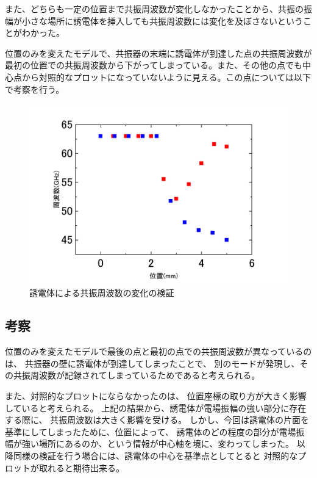 また、どちらも一定の位置まで共振周波数が変化しなかったことから、共振の振幅が小さな場所に誘電体を挿入しても共振周波数には変化を及ぼさないということがわかった。

位置のみを変えたモデルで、共振器の末端に誘電体が到達した点の共振周波数が最初の位置での共振周波数から下がってしまっている。また、その他の点でも中心点から対照的なプロットになっていないように見える。この点については以下で考察を行う。

\vspace{10 mm}

\begin{figure}[h]
  \begin{center}
    \includegraphics[width=12cm]{./image/plot1.jpg}
    \caption{誘電体による共振周波数の変化の検証}
    \label{fig:Cavity}
  \end{center}
\end{figure}


\subsection*{考察}
位置のみを変えたモデルで最後の点と最初の点での共振周波数が異なっているのは、
共振器の壁に誘電体が到達してしまったことで、
別のモードが発現し、その共振周波数が記録されてしまっているためであると考えられる。

また、対照的なプロットにならなかったのは、
位置座標の取り方が大きく影響していると考えられる。
上記の結果から、誘電体が電場振幅の強い部分に存在する際に、
共振周波数は大きく影響を受ける。
しかし、今回は誘電体の片面を基準にしてしまったために、位置によって、
誘電体のどの程度の部分が電場振幅が強い場所にあるのか、という情報が中心軸を境に、変わってしまった。
以降同様の検証を行う場合には、誘電体の中心を基準点としてとると
対照的なプロットが取れると期待出来る。



